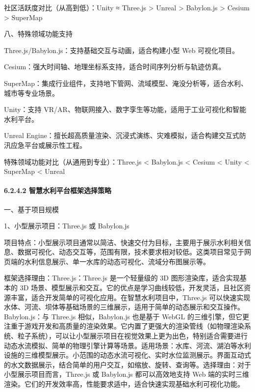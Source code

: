 社区活跃度对比（从高到低）：Unity ≈ Three.js \textgreater{} Unreal \textgreater{} Babylon.js \textgreater{} Cesium \textgreater{} SuperMap

八、特殊领域功能支持

Three.js/Babylon.js：支持基础交互与动画，适合构建小型 Web 可视化项目。

Cesium：强大时间轴、地理坐标系支持，适合时间序列分析与轨迹仿真。

SuperMap：集成行业组件，支持地下管网、流域模型、淹没分析等，适合水利、城市等专业场景。

Unity：支持 VR/AR、物联网接入、数字孪生等功能，适用于工业可视化和智能水利平台。

Unreal Engine：擅长超高质量渲染、沉浸式演练、灾难模拟，适合构建交互式防汛应急平台或展示性工程。

特殊领域功能对比（从通用到专业）：Three.js \textless{} Babylon.js \textless{} Cesium \textless{} Unity \textless{} SuperMap \textless{} Unreal

\paragraph{6.2.4.2 智慧水利平台框架选择策略}\label{ux667aux6167ux6c34ux5229ux5e73ux53f0ux6846ux67b6ux9009ux62e9ux7b56ux7565}

一、基于项目规模

1、小型展示项目：Three.js 或 Babylon.js

项目特点：小型展示项目通常以简洁、快速交付为目标，主要用于展示水利相关信息、数据可视化、动态交互等，范围有限，技术要求相对较低。这类项目常见于网页端的水利信息展示、单一水库的动态可视化、流域分布图展示等。

框架选择理由：Three.js：Three.js 是一个轻量级的 3D 图形渲染库，适合实现基本的 3D 场景、模型展示和交互。它的优点是学习曲线较低，开发灵活，且社区资源丰富，适合开发简单的可视化应用。在智慧水利项目中，Three.js 可以快速实现水体、河流、坝体等基础场景的三维展示，适用于简单的动态展示和交互操作。Babylon.js：与 Three.js 相似，Babylon.js 也是基于 WebGL 的三维引擎，但它更注重于游戏开发和高质量的渲染效果。它内置了更强大的渲染管线（如物理渲染系统、粒子系统），可以让小型展示项目在视觉效果上更为出色，特别适合需要进行动态水流模拟、简单的物理引擎计算等场景。适用场景：水库、河流、湖泊等水利设施的三维模型展示。小范围的动态水流可视化、实时水位监测展示。界面互动式的水文数据展示，结合简单的用户交互，如缩放、旋转、查询等。选择理由：对于小型展示项目而言，Three.js 或 Babylon.js 都可以高效地支持 Web 端的实时三维渲染。它们的开发效率高，性能要求适中，适合快速实现基础水利可视化功能。

